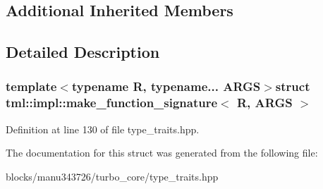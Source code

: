 \subsection*{Additional Inherited Members}


\subsection{Detailed Description}
\subsubsection*{template$<$typename R, typename... A\+R\+G\+S$>$struct tml\+::impl\+::make\+\_\+function\+\_\+signature$<$ R, A\+R\+G\+S $>$}



Definition at line 130 of file type\+\_\+traits.\+hpp.



The documentation for this struct was generated from the following file\+:\begin{DoxyCompactItemize}
\item 
blocks/manu343726/turbo\+\_\+core/type\+\_\+traits.\+hpp\end{DoxyCompactItemize}
